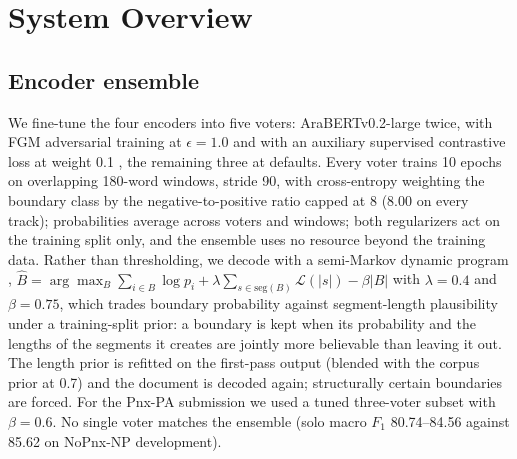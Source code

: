 \documentclass[11pt]{article}
\begin{document}
\section{System Overview}
\subsection{Encoder ensemble}
We fine-tune the four encoders into five voters: AraBERTv0.2-large twice, with FGM
adversarial training at $\epsilon = 1.0$ \citep{miyato2017adversarial} and with an
auxiliary supervised contrastive loss at weight 0.1 \citep{khosla2020supervised}, the
remaining three at defaults. Every voter trains 10
epochs on overlapping 180-word windows, stride 90, with cross-entropy weighting the
boundary class by the negative-to-positive ratio capped at 8 (8.00 on every track); probabilities average across voters and windows; both
regularizers act on the training split only, and the ensemble uses no resource beyond
the training data. Rather than thresholding, we decode with a
semi-Markov dynamic program \citep{sarawagi2004semimarkov},
$\hat{B} = \arg\max_{B} \sum_{i \in B} \log p_i + \lambda \sum_{s \in \mathrm{seg}(B)} \mathcal{L}(|s|) - \beta |B|$
with $\lambda = 0.4$ and $\beta = 0.75$, which trades boundary probability against
segment-length plausibility under a training-split prior: a boundary is kept when its
probability and the lengths of the segments it creates are jointly more believable
than leaving it out. The length prior is refitted on the first-pass output (blended with
the corpus prior at 0.7) and the document is decoded again; structurally certain
boundaries are forced. For the Pnx-PA submission we used a tuned three-voter subset
with $\beta = 0.6$. No single voter matches the ensemble (solo
macro $F_1$ 80.74--84.56 against 85.62 on NoPnx-NP development).
\end{document}
